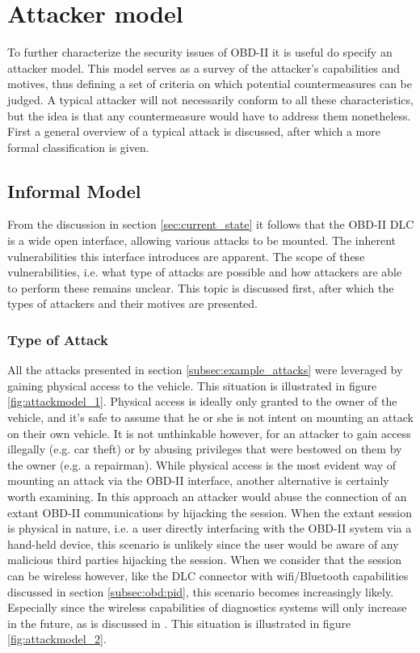 \section{Attacker model} 
\label{sec:attacker_model}

To further characterize the security issues of OBD-II it is useful do specify an attacker model. This model serves as a survey of the attacker's capabilities and motives, thus defining a set of criteria on which potential countermeasures can be judged. A typical attacker will not necessarily conform to all these characteristics, but the idea is that any countermeasure would have to address them nonetheless. First a general overview of a typical attack is discussed, after which a more formal classification is given.

\subsection{Informal Model}
\label{subsec:informal_model}

From the discussion in section \ref{sec:current_state} it follows that the OBD-II DLC is a wide open interface, allowing various attacks to be mounted. The inherent vulnerabilities this interface introduces are apparent. The scope of these vulnerabilities, i.e. what type of attacks are possible and how attackers are able to perform these remains unclear. This topic is discussed first, after which the types of attackers and their motives are presented.

\subsubsection{Type of Attack}  
All the attacks presented in section \ref{subsec:example_attacks} were leveraged by gaining physical access to the vehicle. This situation is illustrated in figure \ref{fig:attackmodel_1}. Physical access is ideally only granted to the owner of the vehicle, and it's safe to assume that he or she is not intent on mounting an attack on their own vehicle. It is not unthinkable however, for an attacker to gain access illegally (e.g. car theft) or by abusing privileges that were bestowed on them by the owner (e.g. a repairman). While physical access is the most evident way of mounting an attack via the OBD-II interface, another alternative is certainly worth examining. In this approach an attacker would abuse the connection of an extant OBD-II communications by hijacking the session. When the extant session is physical in nature, i.e. a user directly interfacing with the OBD-II system via a hand-held device, this scenario is unlikely since the user would be aware of any malicious third parties hijacking the session. When we consider that the session can be wireless however, like the DLC connector with wifi/Bluetooth capabilities discussed in section \ref{subsec:obd:pid}, this scenario becomes increasingly likely. Especially since the wireless capabilities of diagnostics systems will only increase in the future, as is discussed in \cite{Kleberger}. This situation is illustrated in figure \ref{fig:attackmodel_2}.


